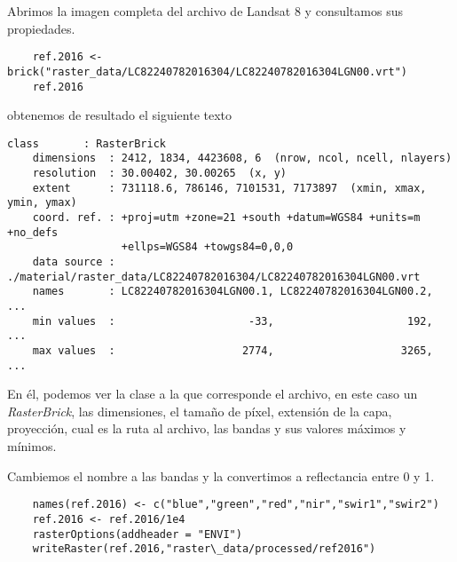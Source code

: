 \begin{exa}
    Abrimos la imagen completa del archivo de Landsat 8 y consultamos sus
    propiedades.
    \begin{lstlisting}
    ref.2016 <- brick("raster_data/LC82240782016304/LC82240782016304LGN00.vrt")
    ref.2016
    \end{lstlisting}
    obtenemos de resultado el siguiente texto
    \begin{Verbatim}[fontsize=\small]
    class       : RasterBrick
    dimensions  : 2412, 1834, 4423608, 6  (nrow, ncol, ncell, nlayers)
    resolution  : 30.00402, 30.00265  (x, y)
    extent      : 731118.6, 786146, 7101531, 7173897  (xmin, xmax, ymin, ymax)
    coord. ref. : +proj=utm +zone=21 +south +datum=WGS84 +units=m +no_defs
                  +ellps=WGS84 +towgs84=0,0,0
    data source : ./material/raster_data/LC82240782016304/LC82240782016304LGN00.vrt
    names       : LC82240782016304LGN00.1, LC82240782016304LGN00.2, ...
    min values  :                     -33,                     192, ...
    max values  :                    2774,                    3265, ...
    \end{Verbatim}
    En \'el, podemos ver la clase a la que corresponde el archivo, en este
    caso un \emph{RasterBrick}, las dimensiones, el tamaño de p\'ixel, extensi\'on
    de la capa, proyecci\'on, cual es la ruta al archivo, las bandas y
    sus valores m\'aximos y m\'inimos.

    Cambiemos el nombre a las bandas y la convertimos a reflectancia entre 0 y 1.

    \begin{lstlisting}
    names(ref.2016) <- c("blue","green","red","nir","swir1","swir2")
    ref.2016 <- ref.2016/1e4
    rasterOptions(addheader = "ENVI")
    writeRaster(ref.2016,"raster\_data/processed/ref2016")
    \end{lstlisting}


\end{exa}
